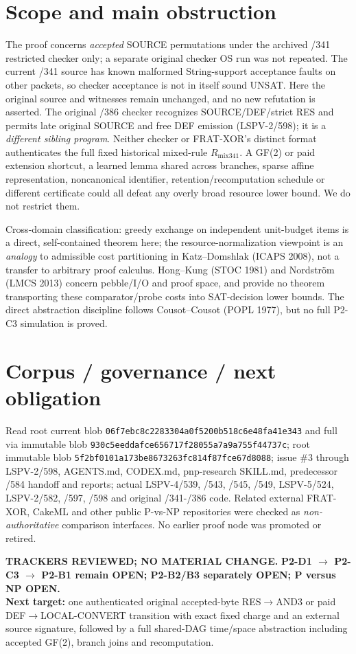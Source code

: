 \documentclass[11pt]{article}
\begin{document}
\section*{Scope and main obstruction}
The proof concerns \emph{accepted} SOURCE permutations under the archived /341 restricted checker only; a separate original checker OS run was not repeated. The current /341 source has known malformed String-support acceptance faults on other packets, so checker acceptance is not in itself sound UNSAT. Here the original source and witnesses remain unchanged, and no new refutation is asserted. The original /386 checker recognizes SOURCE/DEF/strict RES and permits late original SOURCE and free DEF emission (LSPV-2/598); it is a \emph{different sibling program}. Neither checker or FRAT-XOR's distinct format authenticates the full fixed historical mixed-rule $R_{\mathrm{mix341}}$. A GF(2) or paid extension shortcut, a learned lemma shared across branches, sparse affine representation, noncanonical identifier, retention/recomputation schedule or different certificate could all defeat any overly broad resource lower bound. We do not restrict them.

Cross-domain classification: greedy exchange on independent unit-budget items is a direct, self-contained theorem here; the resource-normalization viewpoint is an \emph{analogy} to admissible cost partitioning in Katz--Domshlak (ICAPS 2008), not a transfer to arbitrary proof calculus. Hong--Kung (STOC 1981) and Nordstr\"om (LMCS 2013) concern pebble/I/O and proof space, and provide no theorem transporting these comparator/probe costs into SAT-decision lower bounds. The direct abstraction discipline follows Cousot--Cousot (POPL 1977), but no full P2-C3 simulation is proved.

\section*{Corpus / governance / next obligation}
Read root  current blob \texttt{06f7ebc8c2283304a0f5200b518c6e48fa41e343} and full  via immutable blob \texttt{930c5eeddafce656717f28055a7a9a755f44737c}; root  immutable blob \texttt{5f2bf0101a173be8673263fc814f87fce67d8088}; issue \#3 through LSPV-2/598, AGENTS.md, CODEX.md, pnp-research SKILL.md, predecessor /584 handoff and reports; actual LSPV-4/539, /543, /545, /549, LSPV-5/524, LSPV-2/582, /597, /598 and original /341-/386 code. Related external FRAT-XOR, CakeML and other public P-vs-NP repositories were checked as \emph{non-authoritative} comparison interfaces. No earlier proof node was promoted or retired.

\noindent\textbf{TRACKERS REVIEWED; NO MATERIAL CHANGE.} \textbf{P2-D1 $\to$ P2-C3 $\to$ P2-B1 remain OPEN; P2-B2/B3 separately OPEN; P versus NP OPEN.}\\
\textbf{Next target:} one authenticated original accepted-byte RES$\to$AND3 or paid DEF$\to$LOCAL-CONVERT transition with exact fixed charge and an external source signature, followed by a full shared-DAG time/space abstraction including accepted GF(2), branch joins and recomputation.
\end{document}
